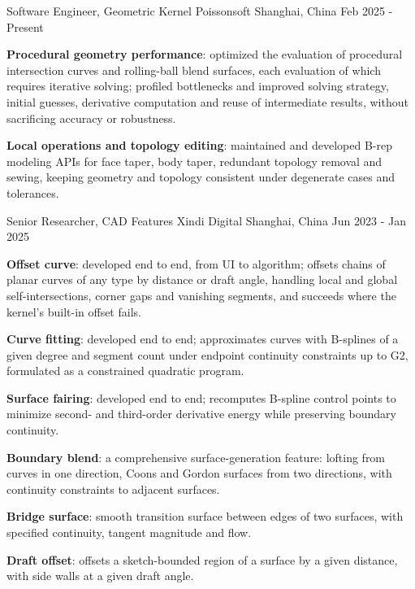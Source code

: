 
  \cventry
    {Software Engineer, Geometric Kernel} %
    {Poissonsoft} %
    {Shanghai, China} %
    {Feb 2025 - Present} %
    {
      \begin{cvitems} %
        \item {\textbf{Procedural geometry performance}: optimized the evaluation of procedural intersection curves and rolling-ball blend surfaces, each evaluation of which requires iterative solving; profiled bottlenecks and improved solving strategy, initial guesses, derivative computation and reuse of intermediate results, without sacrificing accuracy or robustness.}
        \item {\textbf{Local operations and topology editing}: maintained and developed B-rep modeling APIs for face taper, body taper, redundant topology removal and sewing, keeping geometry and topology consistent under degenerate cases and tolerances.}
      \end{cvitems}
    }

  \cventry
    {Senior Researcher, CAD Features} %
    {Xindi Digital} %
    {Shanghai, China} %
    {Jun 2023 - Jan 2025} %
    {
      \begin{cvitems} %
        \item {\textbf{Offset curve}: developed end to end, from UI to algorithm; offsets chains of planar curves of any type by distance or draft angle, handling local and global self-intersections, corner gaps and vanishing segments, and succeeds where the kernel's built-in offset fails.}
        \item {\textbf{Curve fitting}: developed end to end; approximates curves with B-splines of a given degree and segment count under endpoint continuity constraints up to G2, formulated as a constrained quadratic program.}
        \item {\textbf{Surface fairing}: developed end to end; recomputes B-spline control points to minimize second- and third-order derivative energy while preserving boundary continuity.}
        \item {\textbf{Boundary blend}: a comprehensive surface-generation feature: lofting from curves in one direction, Coons and Gordon surfaces from two directions, with continuity constraints to adjacent surfaces.}
        \item {\textbf{Bridge surface}: smooth transition surface between edges of two surfaces, with specified continuity, tangent magnitude and flow.}
        \item {\textbf{Draft offset}: offsets a sketch-bounded region of a surface by a given distance, with side walls at a given draft angle.}
      \end{cvitems}
    }

